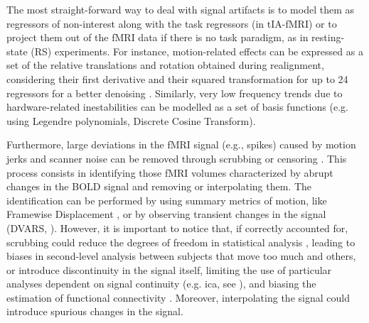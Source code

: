 The most straight-forward way to deal with signal artifacts is to model them as
regressors of non-interest along with the task regressors (in tIA-fMRI) or to
project them out of the fMRI data if there is no task paradigm, as in
resting-state (RS) experiments. For instance, motion-related effects can be
expressed as a set of the relative translations and rotation obtained during
realignment, considering their first derivative and their squared transformation
for up to 24 regressors for a better denoising
\citep{Friston1994Statisticalparametricmaps}. Similarly, very low frequency
trends due to hardware-related inestabilities can be modelled as a set of basis
functions (e.g. using Legendre polynomials, Discrete Cosine Transform).

Furthermore, large deviations in the fMRI signal (e.g., spikes) caused by motion
jerks and scanner noise can be removed through scrubbing or censoring
\citep{Power2012Spurioussystematiccorrelations}. This process consists in
identifying those fMRI volumes characterized by abrupt changes in the BOLD
signal and removing or interpolating them. The identification can be performed
by using summary metrics of motion, like Framewise Displacement
\citep{Power2012Spurioussystematiccorrelations}, or by observing transient
changes in the signal (DVARS, \cite{Power2012Spurioussystematiccorrelations,
Smyser2010LongitudinalAnalysisNeural}). However, it is important to notice that,
if correctly accounted for, scrubbing could reduce the degrees of freedom in
statistical analysis \citep{Mascali2021Evaluationdenoisingstrategies}, leading
to biases in second-level analysis between subjects that move too much and
others, or introduce discontinuity in the signal itself, limiting the use of
particular analyses dependent on signal continuity (e.g. \acrshort*{ica}, see
\cite{CaballeroGaudes2017MethodscleaningBOLD}), and biasing the estimation of
functional connectivity \citep{Mascali2021Evaluationdenoisingstrategies}.
Moreover, interpolating the signal could introduce spurious changes in the
signal.

